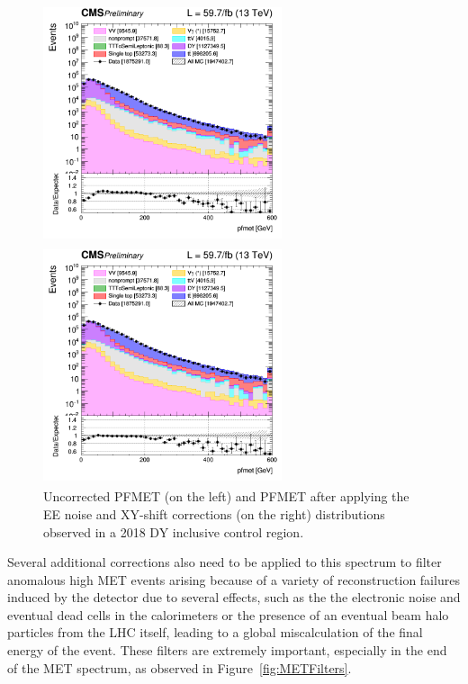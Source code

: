 \documentclass[a4paper, 10pt, openright]{report}
\begin{document}
\begin{figure}[htbp]
\centering
\begin{minipage}[b]{.49\textwidth}
\includegraphics[width=7cm, height=7cm]{figs/2018/log_cratio_inclusiveCR_ll_pfmet.png}
\end{minipage}\hfill
\begin{minipage}[b]{.49\textwidth}
\includegraphics[width=7cm, height=7cm]{figs/2018/log_cratio_inclusiveCR_ll_METcorrected_pt.png}
\end{minipage} \hfill
\caption{Uncorrected PFMET (on the left) and PFMET after applying the EE noise and XY-shift corrections (on the right) distributions observed in a 2018 \ac{DY} inclusive control region.}
\label{fig:metCorrEffect}
\end{figure}

Several additional corrections also need to be applied to this spectrum to filter anomalous high \ac{MET} events arising because of a variety of reconstruction failures induced by the detector due to several effects, such as the the electronic noise and eventual dead cells in the calorimeters or the presence of an eventual beam halo particles from the \ac{LHC} itself, leading to a global miscalculation of the final energy of the event. These filters are extremely important, especially in the end of the \ac{MET} spectrum, as observed in Figure~\ref{fig:METFilters}.
\end{document}
